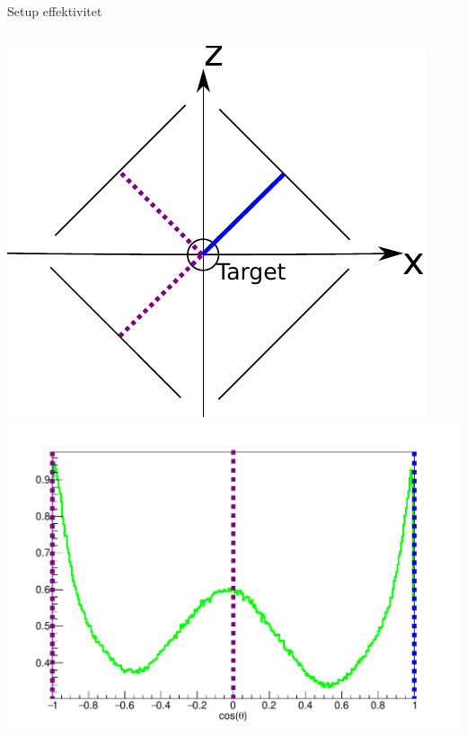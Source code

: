 \begin{frame}{Setup effektivitet}
\begin{columns}
\begin{overprint}
			\includegraphics[width=\columnwidth]{../figures/showAngles/opstilling_show_angles_2.pdf}
			\includegraphics[width=\columnwidth]{../figures/showAngles/data_2.pdf}

\end{overprint}
\end{columns}
\end{frame}
